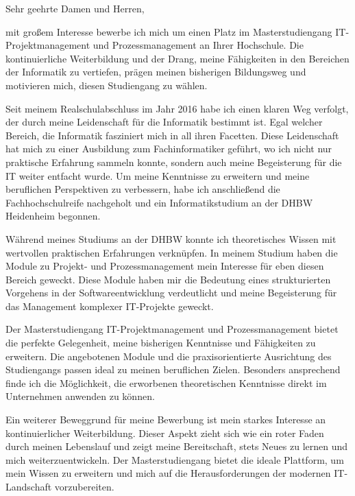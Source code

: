 
\begingroup
\renewcommand{\paragraphstyle}{\fontsize{11pt}{15pt}\bodyfontlight\upshape\color{text}}
\begin{cvparagraph}
    \vspace{11pt}
    \vspace{11pt}

    Sehr geehrte Damen und Herren,

    mit großem Interesse bewerbe ich mich um einen Platz im Masterstudiengang IT-Projektmanagement und Prozessmanagement an Ihrer Hochschule. Die kontinuierliche Weiterbildung und der Drang, meine Fähigkeiten in den Bereichen der Informatik zu vertiefen, prägen meinen bisherigen Bildungsweg und motivieren mich, diesen Studiengang zu wählen.

    Seit meinem Realschulabschluss im Jahr 2016 habe ich einen klaren Weg verfolgt, der durch meine Leidenschaft für die Informatik bestimmt ist. Egal welcher Bereich, die Informatik fasziniert mich in all ihren Facetten. Diese Leidenschaft hat mich zu einer Ausbildung zum Fachinformatiker geführt, wo ich nicht nur praktische Erfahrung sammeln konnte, sondern auch meine Begeisterung für die IT weiter entfacht wurde. Um meine Kenntnisse zu erweitern und meine beruflichen Perspektiven zu verbessern, habe ich anschließend die Fachhochschulreife nachgeholt und ein Informatikstudium an der DHBW Heidenheim begonnen.

    Während meines Studiums an der DHBW konnte ich theoretisches Wissen mit wertvollen praktischen Erfahrungen verknüpfen. In meinem Studium haben die Module zu Projekt- und Prozessmanagement mein Interesse für eben diesen Bereich geweckt. Diese Module haben mir die Bedeutung eines strukturierten Vorgehens in der Softwareentwicklung verdeutlicht und meine Begeisterung für das Management komplexer IT-Projekte geweckt.

    Der Masterstudiengang IT-Projektmanagement und Prozessmanagement bietet die perfekte Gelegenheit, meine bisherigen Kenntnisse und Fähigkeiten zu erweitern. Die angebotenen Module und die praxisorientierte Ausrichtung des Studiengangs passen ideal zu meinen beruflichen Zielen. Besonders ansprechend finde ich die Möglichkeit, die erworbenen theoretischen Kenntnisse direkt im Unternehmen anwenden zu können.

    Ein weiterer Beweggrund für meine Bewerbung ist mein starkes Interesse an kontinuierlicher Weiterbildung. Dieser Aspekt zieht sich wie ein roter Faden durch meinen Lebenslauf und zeigt meine Bereitschaft, stets Neues zu lernen und mich weiterzuentwickeln. Der Masterstudiengang bietet die ideale Plattform, um mein Wissen zu erweitern und mich auf die Herausforderungen der modernen IT-Landschaft vorzubereiten.


\end{cvparagraph}
